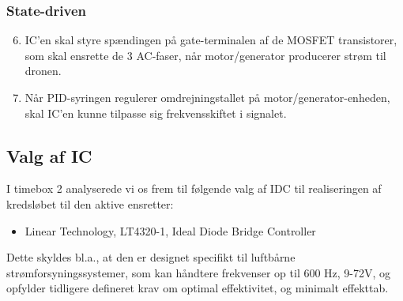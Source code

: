 \subsubsection{State-driven}
\label{sec:state-driven}
\begin{enumerate}[label=2.1.3.\arabic*]
  \setcounter{enumi}{5}
\item IC’en skal styre spændingen på gate-terminalen af de MOSFET transistorer, som skal ensrette de 3 AC-faser, når motor/generator producerer strøm til dronen.
\item Når PID-syringen regulerer omdrejningstallet på motor/generator-enheden, skal IC’en kunne tilpasse sig frekvensskiftet i signalet.
\end{enumerate}



\subsection{Valg af IC }
\label{sec:valg-af-ic}

I timebox 2 analyserede vi os frem til følgende valg af IDC til realiseringen af kredsløbet til den aktive ensretter:
\begin{itemize}
\item Linear Technology, LT4320-1, Ideal Diode Bridge Controller
\end{itemize}

Dette skyldes bl.a., at den er designet specifikt til luftbårne strømforsyningssystemer, som kan håndtere frekvenser op til 600 Hz, 9-72V, og opfylder tidligere defineret krav om optimal effektivitet, og minimalt effekttab.


